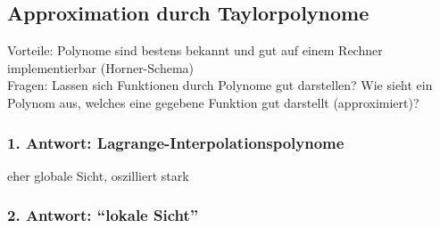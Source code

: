 
\subsection{Approximation durch Taylorpolynome}
\label{sub:Taylorpolynome}

Vorteile: Polynome sind bestens bekannt und gut auf einem Rechner implementierbar (Horner-Schema)\\
Fragen: Lassen sich Funktionen durch Polynome gut darstellen? Wie sieht ein Polynom aus, welches eine gegebene Funktion gut darstellt (approximiert)?

\subsubsection*{1. Antwort: Lagrange-Interpolationspolynome}



eher globale Sicht, oszilliert stark

\subsubsection*{2. Antwort: "`lokale Sicht"'}

